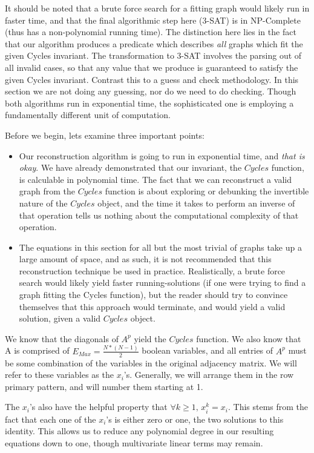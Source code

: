 It should be noted that a brute force search for a fitting graph would likely run in faster time, and that the final algorithmic step here (3-SAT) is in NP-Complete (thus has a non-polynomial running time).
The distinction here lies in the fact that our algorithm produces a predicate which describes \emph{all} graphs which fit the given Cycles invariant.
The transformation to 3-SAT involves the parsing out of all invalid cases, so that any value that we produce is guaranteed to satisfy the given Cycles invariant.
Contrast this to a guess and check methodology.
In this section we are not doing any guessing, nor do we need to do checking.
Though both algorithms run in exponential time, the sophisticated one is employing a fundamentally different unit of computation. 

Before we begin, lets examine three important points:
\begin{itemize}
  \item{
  	Our reconstruction algorithm is going to run in exponential time, and \emph{that is okay}.  
  	We have already demonstrated that our invariant, the $Cycles$ function, is calculable in polynomial time.  
  	The fact that we can reconstruct a valid graph from the $Cycles$ function is about exploring or debunking the invertible nature of the $Cycles$ object, 
  	and the time it takes to perform an inverse of that operation tells us nothing about the computational complexity of that operation.
  }
  \item{
  	The equations in this section for all but the most trivial of graphs take up a large amount of space, and as such, it is not recommended that this reconstruction technique be used in practice.  
  	Realistically, a brute force search would likely yield faster running-solutions (if one were trying to find a graph fitting the Cycles function), but the reader should try to convince themselves that this approach would terminate, 
  	and would yield a valid solution, given a valid $Cycles$ object.
  }
\end{itemize}

We know that the diagonals of $A^p$ yield the $Cycles$ function.
We also know that A is comprised of $E_{Max} = \frac{N * (N - 1)}{2}$ boolean variables, and all entries of $A^p$ must be some combination of the variables in the original adjacency matrix. 
We will refer to these variables as the $x_i$'s. Generally, we will arrange them in the row primary pattern, and will number them starting at 1.

The $x_i$'s also have the helpful property that $\forall k \geq 1,\, x_i^k = x_i $. 
This stems from the fact that each one of the $x_i$'s is either zero or one, the two solutions to this identity.  
This allows us to reduce any polynomial degree in our resulting equations down to one, though multivariate linear terms may remain.

